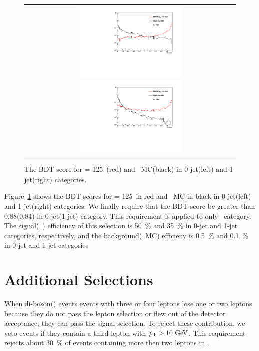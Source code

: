 \begin{figure}[htp] 
\centering
\begin{tabular}{c} 
\includegraphics[width=0.5\textwidth]{figures/dymva_0j.pdf} 
\includegraphics[width=0.5\textwidth]{figures/dymva_1j.pdf} 
\end{tabular} 
\caption{The BDT score for \mHi = 125~\GeV(red) and \dyll\ MC(black)
in 0-jet(left) and 1-jet(right) categories.} 
\label{fig:dymva} 
\end{figure} 

Figure~\ref{fig:dymva} shows the BDT scores for \mHi = 125~\GeV in red 
and \dyll\ MC in black in 0-jet(left) and 1-jet(right) categories. We finally require 
that the BDT score be greater than 0.88(0.84) in 0-jet(1-jet) category. 
This requirement is applied to only \SF\ category. 
The signal(~\GeV) efficiency of this selection is 50~\% and 35~\% 
in 0-jet and 1-jet categories, respectively, 
and the background(\dyll\ MC) efficieny is 0.5~\% and 0.1~\% in 0-jet and 1-jet categories

\section{Additional Selections}
When di-boson(\vv) events events with three or four leptons lose one or two leptons 
because they do not pass the lepton selection or flew out of the 
detector acceptance, they can pass the signal selection.  
To reject these contribution, we veto events if they contain 
a third lepton with $p_\mathrm{T}>10~\mathrm{Ge\kern -0.1em V}$. This requirement rejects about 30~\% of 
events containing more then two leptons in \vv. 

